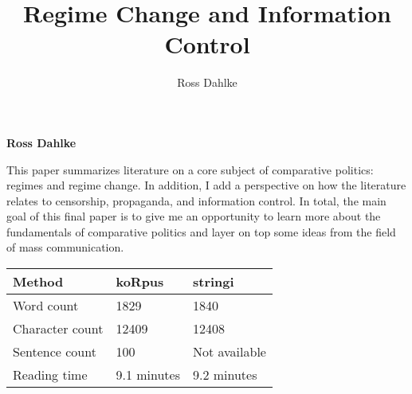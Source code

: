 \documentclass[12pt,]{article}
\title{Regime Change and Information Control  }
\author{\Large Ross Dahlke\vspace{0.05in} \newline\normalsize\emph{}  }
\date{}
\newcommand*{\authorfont}{\fontfamily{phv}\selectfont}
\renewenvironment{abstract}
 {{%
    \setlength{\leftmargin}{0mm}
    \setlength{\rightmargin}{\leftmargin}%
  }%
  \relax}
 {\endlist}
\begin{document}
	
%

{%
\setlength{\parindent}{0pt}
\thispagestyle{plain}
{\fontsize{18}{20}\selectfont\raggedright 
\maketitle  %

}

{
   \vskip 13.5pt\relax \normalsize\fontsize{11}{12} 
\textbf{\authorfont Ross Dahlke} \hskip 15pt \emph{\small }   

}

}








\begin{abstract}

    \hbox{\vrule height .2pt width 39.14pc}

    \vskip 8.5pt %

\noindent This paper summarizes literature on a core subject of comparative
politics: regimes and regime change. In addition, I add a perspective on
how the literature relates to censorship, propaganda, and information
control. In total, the main goal of this final paper is to give me an
opportunity to learn more about the fundamentals of comparative politics
and layer on top some ideas from the field of mass communication.


    \hbox{\vrule height .2pt width 39.14pc}


\end{abstract}


\vskip -8.5pt



\noindent \doublespacing 

\begin{longtable}[]{@{}lll@{}}
\toprule
Method & koRpus & stringi\tabularnewline
\midrule
\endhead
Word count & 1829 & 1840\tabularnewline
Character count & 12409 & 12408\tabularnewline
Sentence count & 100 & Not available\tabularnewline
Reading time & 9.1 minutes & 9.2 minutes\tabularnewline
\bottomrule
\end{longtable}
\end{document}

